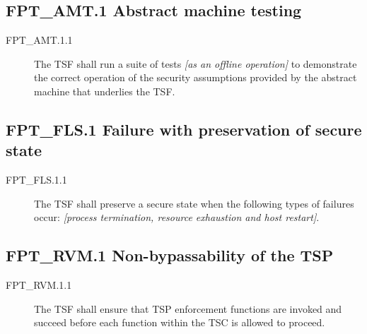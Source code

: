 \documentclass[10pt,a4paper,english]{book}
\begin{document}
\subsection{FPT{\_}AMT.1 Abstract machine testing}
\begin{description}
\item[FPT{\_}AMT.1.1 ]

The TSF shall run a suite of tests \emph{{[}as an offline
operation]} to demonstrate the correct operation of the security
assumptions provided by the abstract machine that underlies the
TSF.

\end{description}



\hypertarget{fpt-fls-1-failure-with-preservation-of-secure-state}{}
\subsection{FPT{\_}FLS.1 Failure with preservation of secure state}
\begin{description}
\item[FPT{\_}FLS.1.1 ]

The TSF shall preserve a secure state when the following types of
failures occur: \emph{{[}process termination, resource
exhaustion and host restart]}.

\end{description}



\hypertarget{fpt-rvm-1-non-bypassability-of-the-tsp}{}
\subsection{FPT{\_}RVM.1 Non-bypassability of the TSP}
\begin{description}
\item[FPT{\_}RVM.1.1 ]

The TSF shall ensure that TSP enforcement functions are invoked
and succeed before each function within the TSC is allowed to
proceed.

\end{description}
\end{document}
